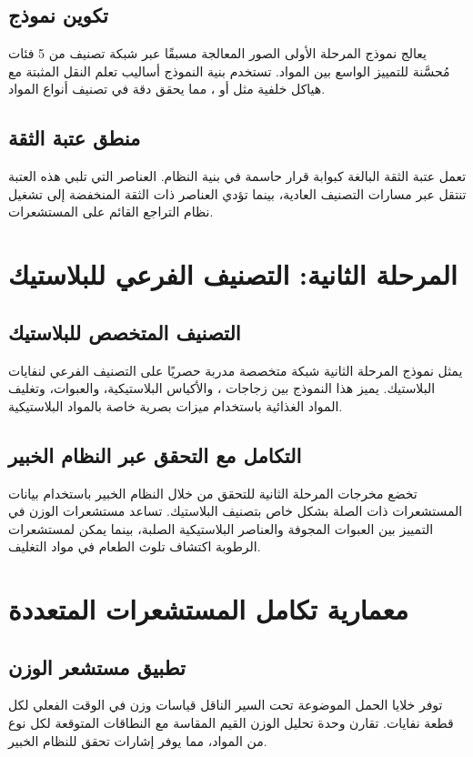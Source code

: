 \documentclass[11pt, a4paper]{article}
\begin{document}
\begin{RTL}
\subsection{تكوين نموذج }
يعالج نموذج المرحلة الأولى الصور المعالجة مسبقًا عبر شبكة تصنيف من 5 فئات مُحسَّنة للتمييز الواسع بين المواد. تستخدم بنية النموذج أساليب تعلم النقل المثبتة مع هياكل خلفية مثل  أو ، مما يحقق دقة  في تصنيف أنواع المواد.

\subsection{منطق عتبة الثقة}
تعمل عتبة الثقة البالغة  كبوابة قرار حاسمة في بنية النظام. العناصر التي تلبي هذه العتبة تنتقل عبر مسارات التصنيف العادية، بينما تؤدي العناصر ذات الثقة المنخفضة إلى تشغيل نظام التراجع القائم على المستشعرات.

\section{المرحلة الثانية: التصنيف الفرعي للبلاستيك}
\subsection{التصنيف المتخصص للبلاستيك}
يمثل نموذج المرحلة الثانية شبكة  متخصصة مدربة حصريًا على التصنيف الفرعي لنفايات البلاستيك. يميز هذا النموذج بين زجاجات ، والأكياس البلاستيكية، والعبوات، وتغليف المواد الغذائية باستخدام ميزات بصرية خاصة بالمواد البلاستيكية.

\subsection{التكامل مع التحقق عبر النظام الخبير}
تخضع مخرجات المرحلة الثانية للتحقق من خلال النظام الخبير باستخدام بيانات المستشعرات ذات الصلة بشكل خاص بتصنيف البلاستيك. تساعد مستشعرات الوزن في التمييز بين العبوات المجوفة والعناصر البلاستيكية الصلبة، بينما يمكن لمستشعرات الرطوبة اكتشاف تلوث الطعام في مواد التغليف.

\section{معمارية تكامل المستشعرات المتعددة}
\subsection{تطبيق مستشعر الوزن}
توفر خلايا الحمل الموضوعة تحت السير الناقل قياسات وزن في الوقت الفعلي لكل قطعة نفايات. تقارن وحدة تحليل الوزن القيم المقاسة مع النطاقات المتوقعة لكل نوع من المواد، مما يوفر إشارات تحقق للنظام الخبير.


\end{RTL}
\end{document}
